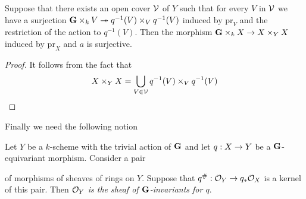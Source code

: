 \begin{fact}\label{fact:kernel_pairs_are_local_on_the_target}
Suppose that there exists an open cover ${\mathcal V}$ of $Y$ such that for every $V$ in ${\mathcal V}$ we have a surjection $\mathbf{G}\times_kV\twoheadrightarrow q^{-1}(V)\times_Vq^{-1}(V)$ induced by $\mathrm{pr}_V$ and the restriction of the action to $q^{-1}(V)$. Then the morphism $\mathbf{G}\times_kX\rightarrow X\times_YX$ induced by $\mathrm{pr}_X$ and $a$ is surjective.
\end{fact}
\begin{proof}
It follows from the fact that
$$X\times_YX = \bigcup_{V\in {\mathcal V}}q^{-1}(V)\times_Vq^{-1}(V)$$
\end{proof}
\noindent
Finally we need the following notion

\begin{definition}
Let $Y$ be a $k$-scheme with the trivial action of $\mathbf{G}$ and let $q:X\rightarrow Y$ be a $\mathbf{G}$-equivariant morphism. Consider a pair
\begin{center}
\end{center}
of morphisms of sheaves of rings on $Y$. Suppose that $q^{\#}:{\mathcal O}_Y\rightarrow q_*{\mathcal O}_X$ is a kernel of this pair. Then \textit{${\mathcal O}_Y$ is the sheaf of $\mathbf{G}$-invariants for $q$}.
\end{definition}

